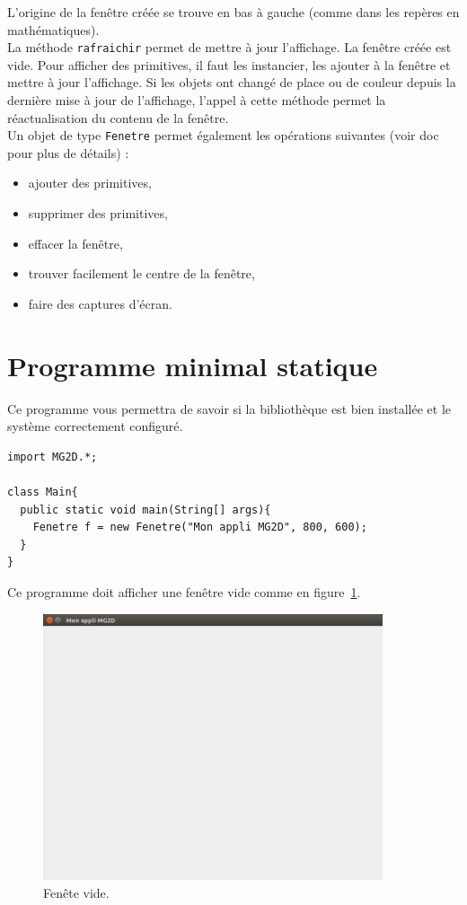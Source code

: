 \documentclass[12pt]{exam}
\begin{document}
L'origine de la fenêtre créée se trouve en bas à gauche (comme dans les repères en mathématiques).\\

La méthode \texttt{rafraichir} permet de mettre à jour l'affichage. La fenêtre créée est vide. Pour afficher des primitives, il faut les instancier, les ajouter à la fenêtre et mettre à jour l'affichage. Si les objets ont changé de place ou de couleur depuis la dernière mise à jour de l'affichage, l'appel à cette méthode permet la réactualisation du contenu de la fenêtre.\\

Un objet de type \texttt{Fenetre} permet également les opérations suivantes (voir doc pour plus de détails) :
\begin{itemize}
\item ajouter des primitives,
\item supprimer des primitives,
\item effacer la fenêtre,
\item trouver facilement le centre de la fenêtre,
\item faire des captures d'écran.
\end{itemize}

\section{Programme minimal statique}
Ce programme vous permettra de savoir si la bibliothèque est bien installée et le système correctement configuré.

\begin{lstlisting}
import MG2D.*;

class Main{
  public static void main(String[] args){
    Fenetre f = new Fenetre("Mon appli MG2D", 800, 600);
  }
}
\end{lstlisting}

Ce programme doit afficher une fenêtre vide comme en figure~\ref{fig}.

\begin{figure}[htbp]
  \centering
  \includegraphics[width=10cm]{./images/appliMG2Dstatique}
  \caption{\label{fig}Fenête vide.}
\end{figure}
\end{document}
